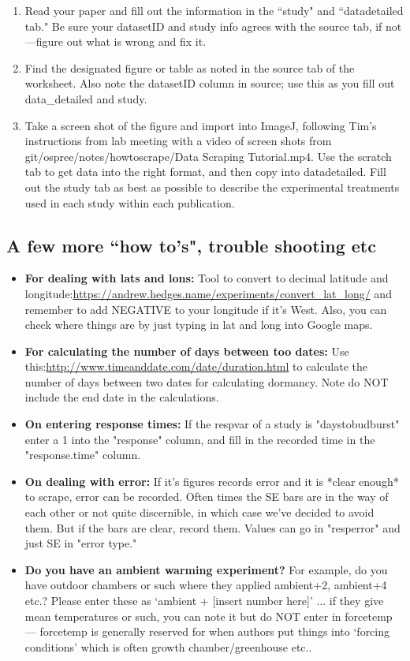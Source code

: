 \documentclass{article}[12pt]
\begin{document}
\begin{enumerate}
\item Read your paper and fill out the information in the ``study" and ``data\textunderscore detailed tab." Be sure your datasetID and study info agrees with the source tab, if not---figure out what is wrong and fix it.
\item Find the designated figure or table as noted in the source tab of the worksheet. Also note the datasetID column in source; use this as you fill out data\_detailed and study.
\item Take a screen shot of the figure and import into ImageJ, following Tim's instructions from lab meeting with a video of screen shots from git/ospree/notes/howtoscrape/Data Scraping Tutorial.mp4. Use the scratch tab to get data into the right format, and then copy into data\textunderscore detailed. Fill out the study tab as best as possible to describe the experimental treatments used in each study within each publication.
\end{enumerate}
\subsection*{A few more ``how to's", trouble shooting etc} 
 \begin{itemize}
 \item \textbf{For dealing with lats and lons:} Tool to convert to decimal latitude and longitude:\url{https://andrew.hedges.name/experiments/convert_lat_long/}  and remember to add NEGATIVE to your longitude if it's West. Also, you can check where things are by just typing in lat and long into Google maps.
\item \textbf{ For calculating the number of days between too dates:} Use this:\url{http://www.timeanddate.com/date/duration.html} to calculate the number of days between two dates for calculating dormancy. Note do NOT include the end date in the calculations.
\item \textbf{On entering response times:} If the respvar of a study is "daystobudburst" enter a 1 into the "response" column, and fill in the recorded time in the "response.time" column.
\item \textbf{On dealing with error:} If it's figures records error and it is *clear enough* to scrape, error can be recorded. Often times the SE bars are in the way of each other or not quite discernible, in which case we've decided to avoid them. But if the bars are clear, record them. Values can go in "resp\textunderscore error" and just SE in "error type."
\item {\bf Do you have an ambient warming experiment?} For example, do you have outdoor chambers or such where they applied ambient+2, ambient+4 etc.? Please enter these as `ambient + [insert number here]'  ... if they give mean temperatures or such, you can note it but do NOT enter in forcetemp --- forcetemp is generally reserved for when authors put things into `forcing conditions' which is often growth chamber/greenhouse etc..
\end{itemize}
\end{document}
